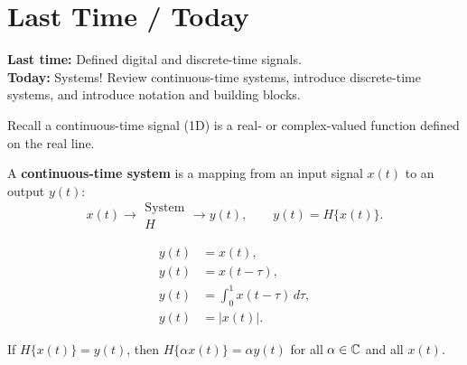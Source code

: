 \documentclass[handout_subfiles_root.tex]{subfiles}
\begin{document}
\maketitle

\section*{Last Time / Today}
\textbf{Last time:} Defined digital and discrete-time signals.\\
\textbf{Today:} Systems! Review continuous-time systems, introduce
discrete-time systems, and introduce notation and building blocks.


Recall a continuous-time signal (1D) is a real- or complex-valued function
defined on the real line.

\begin{center}
\end{center}

\noindent A \textbf{continuous-time system} is a mapping
from an input signal $x(t)$ to an output $y(t)$:
$$x(t) \to \boxed{\begin{array}{c}\text{System}\\ H\end{array}} \to y(t),
  \qquad y(t) = H\{x(t)\}.$$

\begin{examplebox}[title={Example (Continuous-Time Systems)}]
\begin{align*}
  y(t) &= x(t), \\
  y(t) &= x(t-\tau), \\
  y(t) &= \int_0^1 x(t-\tau)\,d\tau, \\
  y(t) &= |x(t)|.
\end{align*}
\end{examplebox}


\begin{defbox}[title={Definition (Homogeneity)}]
If $H\{x(t)\} = y(t)$, then $H\{\alpha x(t)\} = \alpha y(t)$ for all
$\alpha \in \mathbb{C}$ and all $x(t)$.
\end{defbox}
\end{document}
